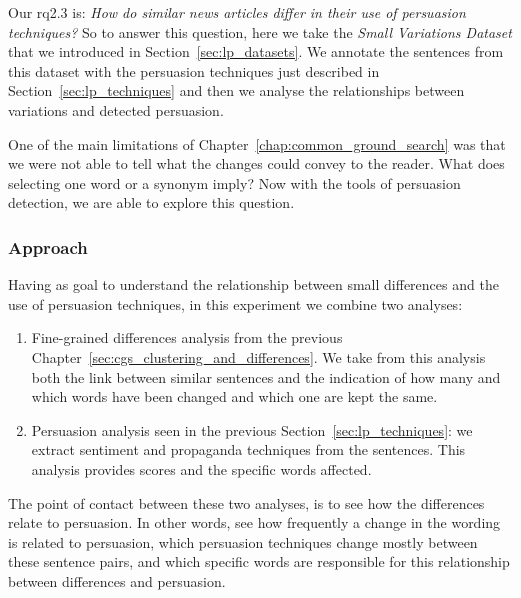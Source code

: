 Our \acrshort{rq}2.3 is: \emph{How do similar news articles differ in their use of persuasion techniques?}
So to answer this question, here we take
the \emph{Small Variations Dataset} that we introduced in Section~\ref{sec:lp_datasets}.
We annotate the sentences from this dataset with the persuasion techniques just described in Section~\ref{sec:lp_techniques} and then we analyse the relationships between variations and detected persuasion.

One of the main limitations of Chapter~\ref{chap:common_ground_search} was that we were not able to tell what the changes could convey to the reader. What does selecting one word or a synonym imply? Now with the tools of persuasion detection, we are able to explore this question.




\subsubsection{Approach}
\label{ssec:lp_relationship_small_variations_appr}

Having as goal to understand the relationship between small differences
and the use of persuasion techniques, in this experiment we combine two analyses:
\begin{enumerate}
    \item Fine-grained differences analysis from the previous Chapter~\ref{sec:cgs_clustering_and_differences}. We take from this analysis both the link between similar sentences and the indication of how many and which words have been changed and which one are kept the same.
    \item Persuasion analysis seen in the previous Section~\ref{sec:lp_techniques}: we extract sentiment and propaganda techniques from the sentences. This analysis provides scores and the specific words affected.
\end{enumerate}

The point of contact between these two analyses, is to see how the differences relate to persuasion. In other words, see how frequently a change in the wording is related to persuasion, which persuasion techniques change mostly between these sentence pairs, and which specific words are responsible for this relationship between differences and persuasion.


